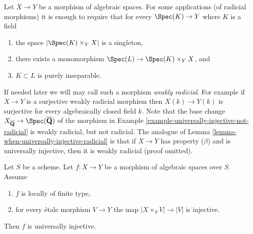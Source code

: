 \begin{remark}
\label{remark-weakly-radicial}
Let $X \to Y$ be a morphism of algebraic spaces.
For some applications (of radicial morphisms)
it is enough to require that for every
$\Spec(K) \to Y$ where $K$ is a field
\begin{enumerate}
\item the space $|\Spec(K) \times_Y X|$ is a singleton,
\item there exists a monomorphism
$\Spec(L) \to \Spec(K) \times_Y X$, and
\item $K \subset L$ is purely inseparable.
\end{enumerate}
If needed later we will may call such a morphism {\it weakly radicial}.
For example if $X \to Y$ is a surjective weakly radicial morphism
then $X(k) \to Y(k)$ is surjective for every algebraically closed field $k$.
Note that the base change
$X_{\overline{\mathbf{Q}}} \to \Spec(\overline{\mathbf{Q}})$
of the morphism in
Example \ref{example-universally-injective-not-radicial}
is weakly radicial, but not radicial. The analogue of
Lemma \ref{lemma-when-universally-injective-radicial}
is that if $X \to Y$ has property ($\beta$) and is universally
injective, then it is weakly radicial (proof omitted).
\end{remark}

\begin{lemma}
\label{lemma-check-universally-injective}
Let $S$ be a scheme. Let $f : X \to Y$ be a morphism of algebraic
spaces over $S$. Assume
\begin{enumerate}
\item $f$ is locally of finite type,
\item for every \'etale morphism $V \to Y$ the map $|X \times_Y V| \to |V|$
is injective.
\end{enumerate}
Then $f$ is universally injective.
\end{lemma}


